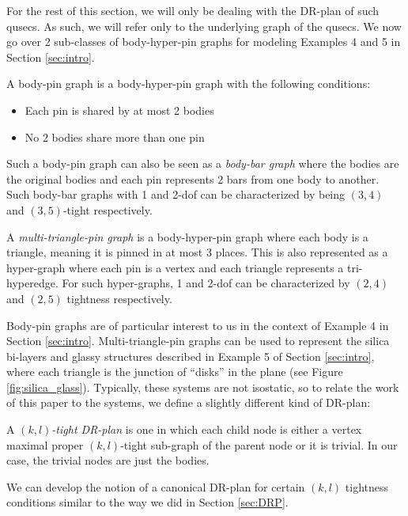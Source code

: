 For the rest of this section, we will only be dealing with the DR-plan of such qusecs. As such, we will refer only to the underlying graph of the qusecs. We now go over 2 sub-classes of body-hyper-pin graphs for modeling Examples 4 and 5 in Section \ref{sec:intro}.

\begin{definition}
\label{def:body-pin}
    A body-pin graph is a body-hyper-pin graph with the following conditions:
    \begin{itemize}
        \item Each pin is shared by at most 2 bodies
        \item No 2 bodies share more than one pin
    \end{itemize}
    Such a body-pin graph can also be seen as a \emph{body-bar graph} where the bodies are the original bodies and each pin represents 2 bars from one body to another. Such body-bar graphs with 1 and 2-dof can be characterized by being $(3,4)$ and $(3,5)$-tight respectively.
\end{definition}

\begin{definition}
    A \emph{multi-triangle-pin graph} is a body-hyper-pin graph where each body is a triangle, meaning it is pinned in at most 3 places. This is also represented as a hyper-graph where each pin is a vertex and each triangle represents a tri-hyperedge. For such hyper-graphs, 1 and 2-dof can be characterized by $(2,4)$ and $(2,5)$ tightness respectively.
\end{definition}

Body-pin graphs are of particular interest to us in the context of Example 4 in Section \ref{sec:intro}. Multi-triangle-pin graphs can be used to represent the silica bi-layers and glassy structures described in Example 5 of Section \ref{sec:intro}, where each triangle is the junction of ``disks'' in the plane (see Figure \ref{fig:silica_glass}). Typically, these systems are not isostatic, so to relate the work of this paper to the systems, we define a slightly different kind of DR-plan:

\begin{definition}
    A \emph{$(k,l)$-tight DR-plan} is one in which each child node is either a vertex maximal proper $(k,l)$-tight sub-graph of the parent node or it is trivial. In our case, the trivial nodes are just the bodies.
\end{definition}

We can develop the notion of a canonical DR-plan for certain $(k,l)$ tightness conditions similar to the way we did in Section \ref{sec:DRP}.


